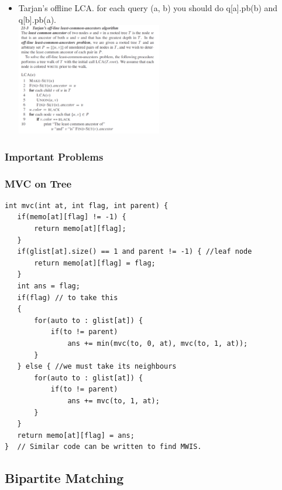 \documentclass[8pt, a4paper, oneside, twocolumn]{extarticle}
\begin{document}
\begin{itemize}
    \item Tarjan's offline LCA. for each query (a, b) you should do q[a].pb(b) and q[b].pb(a).
\\\includegraphics[width=0.5\textwidth,height=0.5\textheight,keepaspectratio]{tar}
\end{itemize}
\subsubsection{Important Problems}
\subsubsection{MVC on Tree}
\begin{verbatim}
int mvc(int at, int flag, int parent) { 
   if(memo[at][flag] != -1) {
       return memo[at][flag];
   }
   if(glist[at].size() == 1 and parent != -1) { //leaf node
       return memo[at][flag] = flag;
   }
   int ans = flag;
   if(flag) // to take this
   {
       for(auto to : glist[at]) {
           if(to != parent)
               ans += min(mvc(to, 0, at), mvc(to, 1, at));
       }
   } else { //we must take its neighbours
       for(auto to : glist[at]) {
           if(to != parent)
               ans += mvc(to, 1, at);
       }
   }
   return memo[at][flag] = ans;
}  // Similar code can be written to find MWIS.
\end{verbatim}
\subsection{Bipartite Matching}
\end{document}

